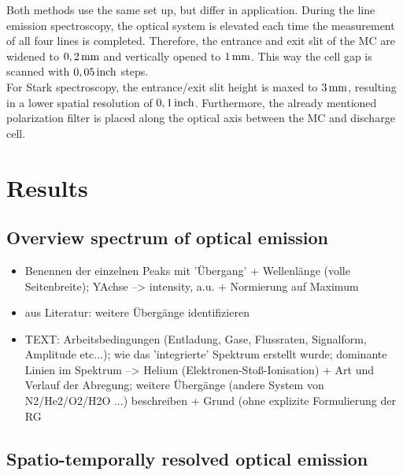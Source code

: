 \documentclass[a4paper,10pt]{article}
\begin{document}
			Both methods use the same set up, but differ in application. During the line emission spectroscopy, the optical system is elevated each time the measurement of all four lines is completed. Therefore, the entrance and exit slit of the MC are widened to $\unit[0,2]{mm}$ and vertically opened to $\unit[1]{mm}$. This way the cell gap is scanned with $\unit[0,05]{inch}$ steps.\\
			For Stark spectroscopy, the entrance/exit slit height is maxed to $\unit[3]{mm}$, resulting in a lower spatial resolution of $\unit[0,1]{inch}$. Furthermore, the already mentioned polarization filter is placed along the optical axis between the MC and discharge cell.

	\section{Results}

		\subsection{Overview spectrum of optical emission}
		
		\begin{itemize}
			\item Benennen der einzelnen Peaks mit 'Übergang' + Wellenlänge (volle Seitenbreite); YAchse --> intensity, a.u. + Normierung auf Maximum
			\item aus Literatur: weitere Übergänge identifizieren
			\item TEXT: Arbeitsbedingungen (Entladung, Gase, Flussraten, Signalform, Amplitude etc...); wie das 'integrierte' Spektrum erstellt wurde; dominante Linien im Spektrum --> Helium (Elektronen-Stoß-Ionisation) + Art und Verlauf der Abregung; weitere Übergänge (andere System von N2/He2/O2/H2O ...) beschreiben + Grund (ohne explizite Formulierung der RG
		\end{itemize}
		
		\subsection{Spatio-temporally resolved optical emission}
		
\end{document}
